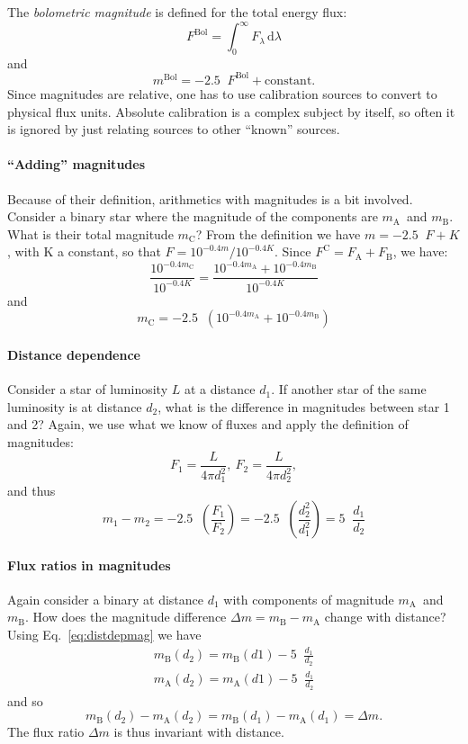 \documentclass[12pt]{article}
\numberwithin{equation}{section}
\def\dd{\mathrm{d}}
\def\Fla{\ensuremath{F_{\lambda}}}
\newcommand*{\logten}{\mathop{\log_{10}}}
\def\mA{\ensuremath{m_{\mathrm{A}}}}
\def\mB{\ensuremath{m_{\mathrm{B}}}}
\def\mC{\ensuremath{m_{\mathrm{C}}}}
\def\FA{\ensuremath{F_{\mathrm{A}}}}
\def\FB{\ensuremath{F_{\mathrm{B}}}}
\def\FC{\ensuremath{F^\mathrm{C}}}
\newcommand{\be}{\begin{equation}}
\newcommand{\ee}{\end{equation}}
\newcommand{\bea}{\begin{eqnarray}}
\newcommand{\eea}{\end{eqnarray}}
\begin{document}
The {\it bolometric magnitude} is defined for the total energy flux:
\be
F^\mathrm{Bol} = \int_0^\infty  \Fla \, \dd \lambda
\ee
and
\be
m^\mathrm{Bol} = -2.5 \logten F^\mathrm{Bol} + \mathrm{constant}.
\ee
Since magnitudes are relative, one has to use calibration sources to convert to physical flux units. Absolute calibration is a complex subject by itself, so often it is ignored by just relating sources to other ``known'' sources.

\paragraph{``Adding'' magnitudes} 
Because of their definition, arithmetics with magnitudes is a bit involved. Consider a binary star where the magnitude of the components are \mA\ and \mB. What is their total magnitude \mC? From the definition we have $m = -2.5 \logten F + K$, with K a constant, so that $F = 10^{-0.4m} / 10^{-0.4K}$. Since $\FC = \FA + \FB$, we have:
\be
\frac{10^{-0.4\mC}}{10^{-0.4K}} = \frac{ 10^{-0.4\mA} + 10^{-0.4\mB} }{ 10^{-0.4K} } 
\ee
and
\be
\mC =  -2.5 \logten \left( 10^{-0.4\mA} + 10^{-0.4\mB}  \right)
\ee

\paragraph{Distance dependence}
Consider a star of luminosity $L$ at a distance $d_1$. If another star of the same luminosity is at distance $d_2$, what is the difference in magnitudes between star 1 and 2? Again, we use what we know of fluxes and apply the definition of magnitudes:
\be
F_1 = \frac{L}{4 \pi d_1^2}, \  F_2 = \frac{L}{4 \pi d_2^2},
\ee
and thus
\be \label{eq:distdepmag}
m_1-m_2 = -2.5 \logten \left( \frac{F_1}{F_2} \right) = -2.5 \logten \left( \frac{d_2^2}{d_1^2} \right)  
               = 5 \logten \frac{d_1}{d_2} 
\ee
\paragraph{Flux ratios in magnitudes} 
Again consider a binary at distance $d_1$ with components of magnitude \mA\ and \mB. How does the magnitude difference $\Delta m = \mB -\mA$ change with distance? Using Eq.~\ref{eq:distdepmag} we have
\bea
 \mB(d_2) =\mB(d1) -5 \logten \frac{d_1}{d_2} \nonumber \\
 \mA(d_2) =\mA(d1) -5 \logten \frac{d_1}{d_2} 
\eea
and so
\be
\mB(d_2)-\mA(d_2)= \mB(d_1)-\mA(d_1) = \Delta m.
\ee
The flux ratio $\Delta m$ is thus invariant with distance.
\end{document}
